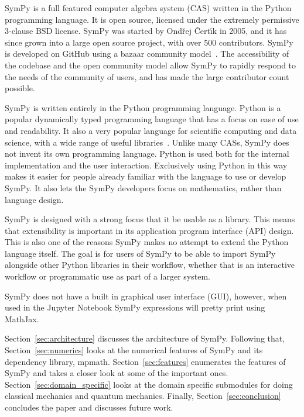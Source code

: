 SymPy is a full featured computer algebra system (CAS) written in the Python
programming language. It is open source, licensed under the extremely
permissive 3-clause BSD license.
SymPy was started by Ond\v{r}ej \v{C}ert\'{\i}k in 2005, and it has since
grown into a large open source project, with over 500 contributors. SymPy is
developed on GitHub using a bazaar community
model~\cite{raymond1999cathedral}. The accessibility of the codebase and the
open community model allow SymPy to rapidly respond to the needs of the
community of users, and has made the large contributor count possible.

SymPy is written entirely in the Python programming language.
Python is a popular dynamically typed programming language that has a focus
on ease of use and readability. It also a very popular language for scientific
computing and data science, with a wide range of useful
libraries~\cite{oliphant2007python}.
Unlike many CASs, SymPy does not invent its own programming language. Python
is used both for the internal implementation and the user interaction.
Exclusively using Python in this way makes it easier for people already
familiar with the language to use or develop SymPy. It also lets the SymPy
developers focus on mathematics, rather than language design.

SymPy is designed with a strong focus that it be usable as a library. This
means that extensibility is important in its application program interface
(API) design. This is also one of the reasons SymPy makes no attempt to extend
the Python language itself. The goal is for users of SymPy to be able to
import SymPy alongside other Python libraries in their workflow, whether that
is an interactive workflow or programmatic use as part of a larger system.

SymPy does not have a built in graphical user interface (GUI), however, when
used in the Jupyter Notebook
SymPy expressions will pretty print using MathJax.

Section~\ref{sec:architecture} discusses the architecture of SymPy. Following
that, Section~\ref{sec:numerics} looks at the numerical features of SymPy and
its dependency library, mpmath. Section~\ref{sec:features} enumerates the
features of SymPy and takes a closer look at some of the important ones.
Section~\ref{sec:domain_specific} looks at the domain specific submodules for
doing classical mechanics and quantum mechanics. Finally,
Section~\ref{sec:conclusion} concludes the paper and discusses future work.
